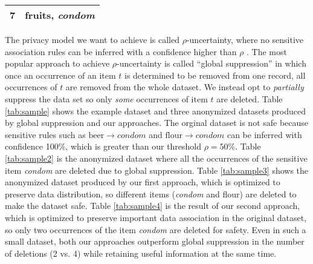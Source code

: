 \begin{table*}[bth]
{\begin{tabular}{|c|l|}
7& fruits, {\em condom}  \\ \hline
\end{tabular}
\label{tab:sample3}
}
\end{table*}

The privacy model we want to achieve is called $\rho$-uncertainty, where
no sensitive association rules can be inferred with a confidence higher than
$\rho$ \cite{Cao:2010:rho}.
%
The most popular approach to achieve $\rho$-uncertainty is called ``global
suppression'' \cite{Cao:2010:rho} in which once an occurrence of an item $t$ is
determined to be removed from one record, all occurrences of $t$ are
removed from the whole dataset. We instead opt to {\em partially}
suppress the data set so only {\em some} occurrences of item $t$ are
deleted.
Table \ref{tab:sample} shows the example dataset
and three anonymized datasets produced by global suppression and our approaches.
The orginal dataset is not safe because sensitive rules such as
$\text{beer} \rightarrow condom$ and $\text{flour} \rightarrow condom$
can be inferred with confidence 100\%, which is greater than our threshold $\rho=50\%$.
Table \ref{tab:sample2} is the anonymized dataset where all the occurrences of
the sensitive item {\em condom} are deleted due to global suppression.
Table \ref{tab:sample3} shows the anonymized dataset produced by our first
approach, which is optimized to preserve data distribution, so different
items ({\em condom} and flour) are deleted to make the dataset safe.
Table \ref{tab:sample4} is the result of our second approach, which is optimized
to preserve important data association in the original dataset, so only
two occurrences of the item {\em condom} are deleted for safety.
Even in such a small dataset, both our approaches outperform global suppression
in the number of deletions (2 vs. 4) while retaining useful information at the same time.

